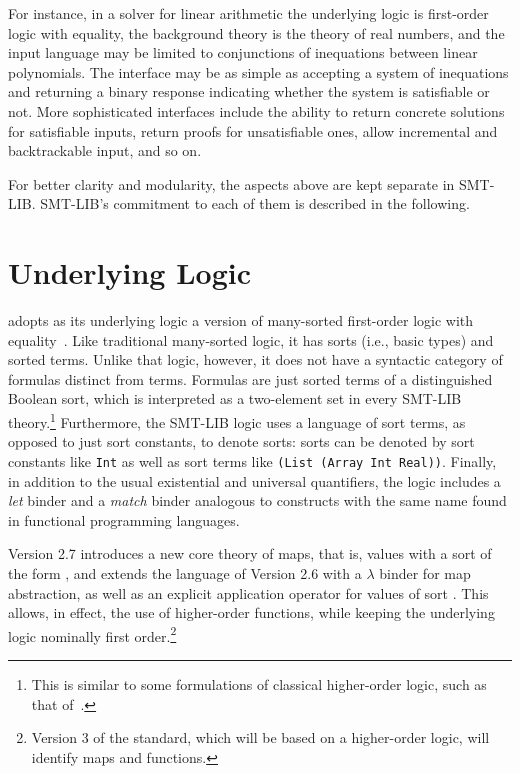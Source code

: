 For instance, in a solver for linear arithmetic
the underlying logic is first-order logic with equality,
the background theory is the theory of real numbers, and
the input language may be limited to conjunctions of inequations 
between linear polynomials.
The interface may be as simple as accepting a system
of inequations and returning a binary response indicating 
whether the system is satisfiable or not.
More sophisticated interfaces include
the ability to return concrete solutions for satisfiable inputs,
return proofs for unsatisfiable ones,
allow incremental and backtrackable input, and so on.

For better clarity and modularity, 
the aspects above are kept separate in SMT-LIB.
SMT-LIB's commitment to each of them is described in the following.


\section{Underlying Logic}


adopts as its underlying logic a version of many-sorted first-order logic 
with equality~\cite{Man-MSL-93,Gal-86,Hen-01}.
Like traditional many-sorted logic, it has sorts (i.e., basic types) 
and sorted terms.
Unlike that logic, however,
it does not have a syntactic category of formulas distinct from terms.
Formulas are just sorted terms of a distinguished Boolean sort,
which is interpreted as a two-element set in every SMT-LIB theory.\footnote{This is similar
to some formulations of classical higher-order logic, such as that of~\cite{andrews86}.}
Furthermore, the SMT-LIB logic uses a language of sort terms,
as opposed to just sort constants, to denote sorts:
sorts can be denoted by sort constants like \texttt{Int}
as well as sort terms like
\texttt{(List (Array Int Real))}.
Finally,
in addition to the usual existential and universal quantifiers, 
the logic includes a \emph{let} binder
and a \emph{match} binder
analogous to constructs with the same name
found in functional programming languages.

\begin{newver}
Version 2.7 introduces a new core theory of maps, 
that is, values with a sort of the form , and 
extends the language of Version 2.6 with a $\lambda$ binder
for map abstraction,
as well as an explicit application operator \ter{\_}
for values of sort . 
This allows, in effect, the use of higher-order functions,
while keeping the underlying logic nominally first order.\footnote{
Version 3 of the standard, which will be based on a higher-order logic,
will identify maps and functions.
}
\end{newver}

